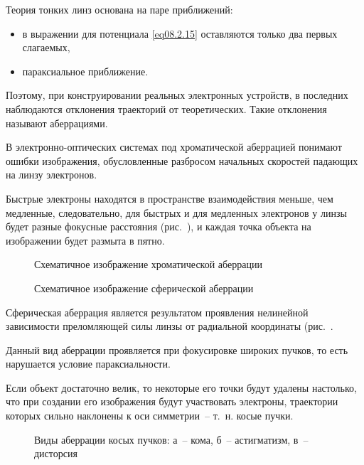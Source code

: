 
Теория тонких линз основана на паре приближений:
\begin{itemize}
  \item в выражении для потенциала \eqref{eq08.2.15} оставляются только два
    первых слагаемых,
  \item параксиальное приближение.
\end{itemize}

Поэтому, при конструировании реальных электронных устройств, в последних
наблюдаются отклонения траекторий от теоретических. Такие отклонения называют
аберрациями.


В электронно-оптических системах под хроматической аберрацией понимают ошибки
изображения, обусловленные разбросом начальных скоростей падающих на линзу
электронов.

Быстрые электроны находятся в пространстве взаимодействия меньше, чем медленные,
следовательно, для быстрых и для медленных электронов у линзы будет разные
фокусные расстояния (рис.~), и каждая точка объекта на изображении
будет размыта в пятно.

\begin{figure}[h!]
  \center
  \parbox{.3\textwidth}{\caption{Схематичное изображение хроматической
    аберрации} \label{pic16chrome}} \hspace{1em}
  \parbox{.3\textwidth}{\caption{Схематичное изображение сферической
    аберрации} \label{pic16sphere}}
\end{figure}


Сферическая аберрация является результатом проявления нелинейной зависимости
преломляющей силы линзы от радиальной координаты (рис.~.

Данный вид аберрации проявляется при фокусировке широких пучков, то есть
нарушается условие параксиальности.


Если объект достаточно велик, то некоторые его точки будут удалены настолько,
что при создании его изображения будут участвовать электроны, траектории которых
сильно наклонены к оси симметрии~-- т.~н. косые пучки.
\begin{figure}[h!]
  \center
  \caption{Виды аберрации косых пучков: а~-- кома, б~-- астигматизм, в~--
    дисторсия}
  \label{pic16skew}
\end{figure}


